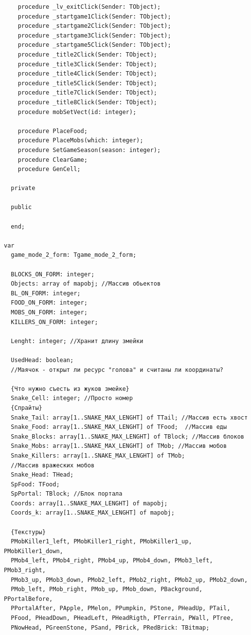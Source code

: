 \documentclass[a4paper,14pt]{extarticle}
\begin{document}
\begin{verbatim}
    procedure _lv_exitClick(Sender: TObject);
    procedure _startgame1Click(Sender: TObject);
    procedure _startgame2Click(Sender: TObject);
    procedure _startgame3Click(Sender: TObject);
    procedure _startgame5Click(Sender: TObject);
    procedure _title2Click(Sender: TObject);
    procedure _title3Click(Sender: TObject);
    procedure _title4Click(Sender: TObject);
    procedure _title5Click(Sender: TObject);
    procedure _title7Click(Sender: TObject);
    procedure _title8Click(Sender: TObject);
    procedure mobSetVect(id: integer);

    procedure PlaceFood;
    procedure PlaceMobs(which: integer);
    procedure SetGameSeason(season: integer);
    procedure ClearGame;
    procedure GenCell;

  private

  public

  end;

var
  game_mode_2_form: Tgame_mode_2_form;

  BLOCKS_ON_FORM: integer;
  Objects: array of mapobj; //Массив обьектов
  BL_ON_FORM: integer;
  FOOD_ON_FORM: integer;
  MOBS_ON_FORM: integer;
  KILLERS_ON_FORM: integer;

  Lenght: integer; //Хранит длину змейки

  UsedHead: boolean;
  //Маячок - открыт ли ресурс "голова" и считаны ли координаты?

  {Что нужно съесть из жуков змейке}
  Snake_Cell: integer; //Просто номер
  {Спрайты}
  Snake_Tail: array[1..SNAKE_MAX_LENGHT] of TTail; //Массив есть хвост
  Snake_Food: array[1..SNAKE_MAX_LENGHT] of TFood;  //Массив еды
  Snake_Blocks: array[1..SNAKE_MAX_LENGHT] of TBlock; //Массив блоков
  Snake_Mobs: array[1..SNAKE_MAX_LENGHT] of TMob; //Массив мобов
  Snake_Killers: array[1..SNAKE_MAX_LENGHT] of TMob;
  //Массив вражеских мобов
  Snake_Head: THead;
  SpFood: TFood;
  SpPortal: TBlock; //Блок портала
  Coords: array[1..SNAKE_MAX_LENGHT] of mapobj;
  Coords_k: array[1..SNAKE_MAX_LENGHT] of mapobj;

  {Текстуры}
  PMobKiller1_left, PMobKiller1_right, PMobKiller1_up, PMobKiller1_down,
  PMob4_left, PMob4_right, PMob4_up, PMob4_down, PMob3_left, PMob3_right,
  PMob3_up, PMob3_down, PMob2_left, PMob2_right, PMob2_up, PMob2_down,
  PMob_left, PMob_right, PMob_up, PMob_down, PBackground, PPortalBefore,
  PPortalAfter, PApple, PMelon, PPumpkin, PStone, PHeadUp, PTail,
  PFood, PHeadDown, PHeadLeft, PHeadRigth, PTerrain, PWall, PTree,
  PNowHead, PGreenStone, PSand, PBrick, PRedBrick: TBitmap;


\end{verbatim}
\end{document}
